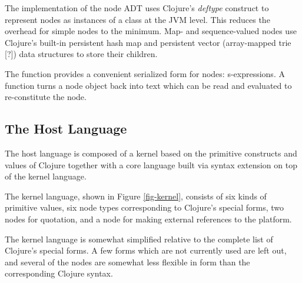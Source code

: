 The implementation of the node ADT uses Clojure's \emph{deftype} construct to represent nodes as instances of a  class at the JVM level. This reduces the overhead for simple nodes to the minimum. Map- and sequence-valued nodes use Clojure's built-in persistent hash map and persistent vector (array-mapped trie [?]) data structures to store their children.

The  function provides a convenient serialized form for nodes: s-expressions. A  function turns a node object back into text which can be read and evaluated to re-constitute the node.


\subsection{The Host Language}\label{host}
The host language is composed of a kernel based on the primitive constructs and values of Clojure together with a core language built via syntax extension on top of the kernel language.

The kernel language, shown in Figure \ref{fig-kernel}, consists of six kinds of primitive values, six node types corresponding to Clojure's special forms, two nodes for quotation, and a node for making external references to the platform.

The kernel language is somewhat simplified relative to the complete list of Clojure's special forms. A few forms which are not currently used are left out, and several of the nodes are somewhat less flexible in form than the corresponding Clojure syntax.

